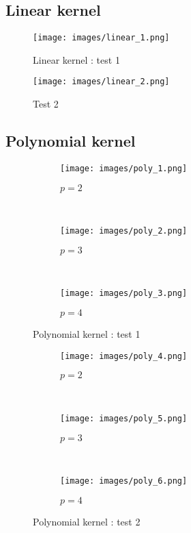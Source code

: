 \documentclass{article}
\begin{document}
\subsection{Linear kernel}
\begin{figure}[!h]
	\begin{center}
		\texttt{[image: images/linear\_1.png]}
		\caption{Linear kernel : test 1}
		\label{linear_figure_1}
	\end{center}
\end{figure}

\begin{figure}[!h]
	\begin{center}
		\texttt{[image: images/linear\_2.png]}
		\caption{Test 2}
		\label{Linear kernel : test 2}
	\end{center}
\end{figure}

\newpage
\subsection{Polynomial kernel}
\begin{figure}[!h]
    \centering
    \begin{subfigure}[b]{0.3\textwidth}
       \texttt{[image: images/poly\_1.png]}
        \caption{$p = 2$} \label{polynomial_1_figure_1}
    \end{subfigure}
    ~ 
    \begin{subfigure}[b]{0.3\textwidth}
       \texttt{[image: images/poly\_2.png]}
        \caption{$p = 3$}  \label{polynomial_1_figure_2}
    \end{subfigure}
     ~ 
    \begin{subfigure}[b]{0.3\textwidth}
       \texttt{[image: images/poly\_3.png]}
        \caption{$p = 4$}  \label{polynomial_1_figure_3}
    \end{subfigure}
    \caption{Polynomial kernel : test 1}
    \label{polynomial_1}
\end{figure}

\begin{figure}[!h]
    \centering
    \begin{subfigure}[b]{0.3\textwidth}
        \texttt{[image: images/poly\_4.png]}
        \caption{$p = 2$} \label{polynomial_2_figure_1}
    \end{subfigure}
    ~ 
    \begin{subfigure}[b]{0.3\textwidth}
        \texttt{[image: images/poly\_5.png]}
        \caption{$p = 3$}  \label{polynomial_2_figure_2}
    \end{subfigure}
     ~ 
    \begin{subfigure}[b]{0.3\textwidth}
        \texttt{[image: images/poly\_6.png]}
        \caption{$p = 4$}  \label{polynomial_2_figure_3}
    \end{subfigure}
    \caption{Polynomial kernel : test 2}
    \label{polynomial_2}
\end{figure}
\end{document}
